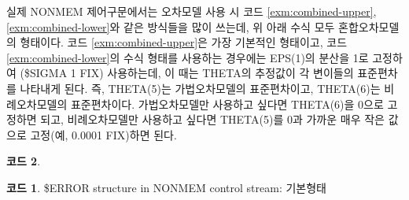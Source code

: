 \documentclass[
  10pt,
  krantz2,
  a4paper]{krantz}
\newenvironment{Shaded}{\begin{snugshade}}{\end{snugshade}}
\newcommand{\DecValTok}[1]{\textcolor[rgb]{0.00,0.00,0.81}{#1}}
\newcommand{\KeywordTok}[1]{\textcolor[rgb]{0.13,0.29,0.53}{\textbf{#1}}}
\newcommand{\NormalTok}[1]{#1}
\newcommand{\OperatorTok}[1]{\textcolor[rgb]{0.81,0.36,0.00}{\textbf{#1}}}
\newcommand{\StringTok}[1]{\textcolor[rgb]{0.31,0.60,0.02}{#1}}
\theoremstyle{definition}
\theoremstyle{definition}
\newtheorem{example}{코드}[chapter]
\theoremstyle{definition}
\theoremstyle{remark}
\begin{document}
실제 NONMEM 제어구문에서는 오차모델 사용 시 코드 \ref{exm:combined-upper}, \ref{exm:combined-lower}와 같은 방식들을 많이 쓰는데, 위 아래 수식 모두 혼합오차모델의 형태이다. 코드 \ref{exm:combined-upper}은 가장 기본적인 형태이고, 코드 \ref{exm:combined-lower}의 수식 형태를 사용하는 경우에는 EPS(1)의 분산을 1로 고정하여 (\$SIGMA 1 FIX) 사용하는데, 이 때는 THETA의 추정값이 각 변이들의 표준편차를 나타내게 된다. 즉, THETA(5)는 가법오차모델의 표준편차이고, THETA(6)는 비례오차모델의 표준편차이다. 가법오차모델만 사용하고 싶다면 THETA(6)을 0으로 고정하면 되고, 비례오차모델만 사용하고 싶다면 THETA(5)를 0과 가까운 매우 작은 값으로 고정(예, 0.0001 FIX)하면 된다.

\begin{Shaded}
\end{Shaded}

\begin{example}
\begin{example}

\protect\hypertarget{exm:combined-upper}{}{\label{exm:combined-upper} }\$ERROR structure in NONMEM control stream: 기본형태

\end{example}
\end{example}

\begin{Shaded}
\end{Shaded}
\end{document}
